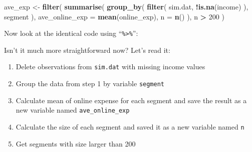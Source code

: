 \documentclass[12pt,]{krantz}
\newenvironment{Shaded}{\begin{snugshade}}{\end{snugshade}}
\newcommand{\KeywordTok}[1]{\textcolor[rgb]{0.13,0.29,0.53}{\textbf{#1}}}
\newcommand{\DataTypeTok}[1]{\textcolor[rgb]{0.13,0.29,0.53}{#1}}
\newcommand{\DecValTok}[1]{\textcolor[rgb]{0.00,0.00,0.81}{#1}}
\newcommand{\StringTok}[1]{\textcolor[rgb]{0.31,0.60,0.02}{#1}}
\newcommand{\OperatorTok}[1]{\textcolor[rgb]{0.81,0.36,0.00}{\textbf{#1}}}
\newcommand{\NormalTok}[1]{#1}
\providecommand{\tightlist}{%
  \setlength{\itemsep}{0pt}\setlength{\parskip}{0pt}}
\theoremstyle{definition}
\theoremstyle{definition}
\theoremstyle{definition}
\theoremstyle{remark}
\begin{document}
\begin{Shaded}
\begin{Highlighting}[]
\NormalTok{ave_exp <-}\StringTok{ }\KeywordTok{filter}\NormalTok{( }
  \KeywordTok{summarise}\NormalTok{(}
    \KeywordTok{group_by}\NormalTok{( }
      \KeywordTok{filter}\NormalTok{(}
\NormalTok{        sim.dat, }
        \OperatorTok{!}\KeywordTok{is.na}\NormalTok{(income)}
\NormalTok{      ), }
\NormalTok{      segment}
\NormalTok{    ), }
    \DataTypeTok{ave_online_exp =} \KeywordTok{mean}\NormalTok{(online_exp), }
    \DataTypeTok{n =} \KeywordTok{n}\NormalTok{()}
\NormalTok{  ), }
\NormalTok{  n }\OperatorTok{>}\StringTok{ }\DecValTok{200}
\NormalTok{) }
\end{Highlighting}
\end{Shaded}

Now look at the identical code using ``\texttt{\%\textgreater{}\%}'':

\begin{Shaded}
\end{Shaded}

Isn't it much more straightforward now? Let's read it:

\begin{enumerate}
\def\labelenumi{\arabic{enumi}.}
\tightlist
\item
  Delete observations from \texttt{sim.dat} with missing income values
\item
  Group the data from step 1 by variable \texttt{segment}
\item
  Calculate mean of online expense for each segment and save the result
  as a new variable named \texttt{ave\_online\_exp}
\item
  Calculate the size of each segment and saved it as a new variable
  named \texttt{n}
\item
  Get segments with size larger than 200
\end{enumerate}
\end{document}
